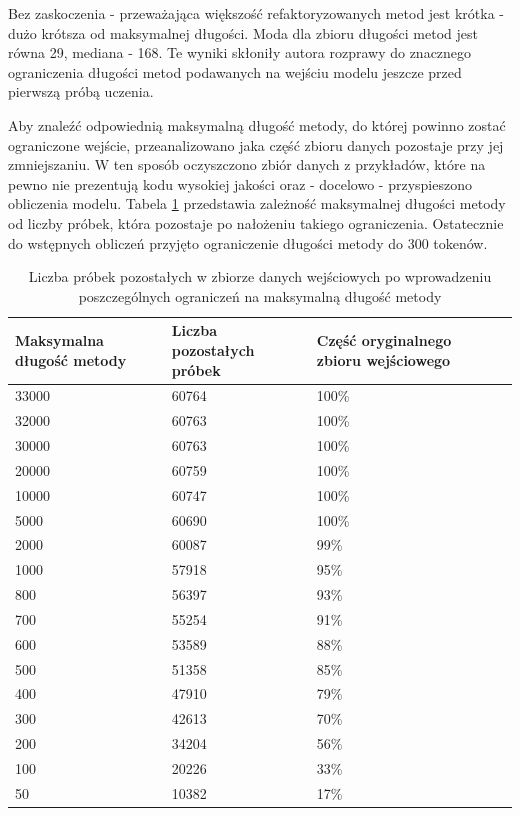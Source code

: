 \documentclass[12pt]{report}
\begin{document}
Bez zaskoczenia - przeważająca większość refaktoryzowanych metod jest krótka - dużo krótsza od maksymalnej długości. Moda dla zbioru długości metod jest równa 29, mediana - 168. Te wyniki skłoniły autora rozprawy do znacznego ograniczenia długości metod podawanych na wejściu modelu jeszcze przed pierwszą próbą uczenia.

Aby znaleźć odpowiednią maksymalną długość metody, do której powinno zostać ograniczone wejście, przeanalizowano jaka część zbioru danych pozostaje przy jej zmniejszaniu. W ten sposób oczyszczono zbiór danych z przykładów, które na pewno nie prezentują kodu wysokiej jakości oraz - docelowo - przyspieszono obliczenia modelu. Tabela \ref{tbl:learn:max-len} przedstawia zależność maksymalnej długości metody od liczby próbek, która pozostaje po nałożeniu takiego ograniczenia. Ostatecznie do wstępnych obliczeń przyjęto ograniczenie długości metody do 300 tokenów.

\begin{table}[t]
\caption{Liczba próbek pozostałych w zbiorze danych wejściowych po wprowadzeniu poszczególnych ograniczeń na maksymalną długość metody}
\label{tbl:learn:max-len}
\begin{tabular}{|l|l|l|l|}
  \hline 
  \textbf{Maksymalna długość metody} & \textbf{Liczba pozostałych próbek} & \textbf{Część oryginalnego zbioru wejściowego} \\ \hline
  33000 & 60764 & 100\% \\ \hline
  32000 & 60763 & 100\% \\ \hline
  30000 & 60763 & 100\% \\ \hline
  20000 & 60759 & 100\% \\ \hline
  10000 & 60747 & 100\% \\ \hline
  5000 & 60690 & 100\% \\ \hline
  2000 & 60087 & 99\% \\ \hline
  1000 & 57918 & 95\% \\ \hline
  800 & 56397 & 93\% \\ \hline
  700 & 55254 & 91\% \\ \hline
  600 & 53589 & 88\% \\ \hline
  500 & 51358 & 85\% \\ \hline
  400 & 47910 & 79\% \\ \hline
  300 & 42613 & 70\% \\ \hline
  200 & 34204 & 56\% \\ \hline
  100 & 20226 & 33\% \\ \hline
  50 & 10382 & 17\% \\ \hline
\end{tabular} 
\end{table}
\end{document}
